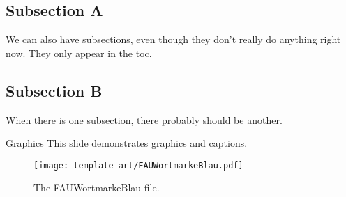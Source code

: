 \subsection{Subsection A}
\begin{frame}{\mbox{}}
	We can also have subsections, even though they don't really do anything right now. They only appear in the toc.
\end{frame}
%
%
%
%
%
\subsection{Subsection B}
\begin{frame}{\mbox{}}
	When there is one subsection, there probably should be another.
\end{frame}
%
%
\begin{frame}{Graphics}
	This slide demonstrates graphics and captions.
	\begin{figure}
		\texttt{[image: template-art/FAUWortmarkeBlau.pdf]}
		\caption{The FAUWortmarkeBlau file.}
	\end{figure}
\end{frame}
%
%
%
%
%

